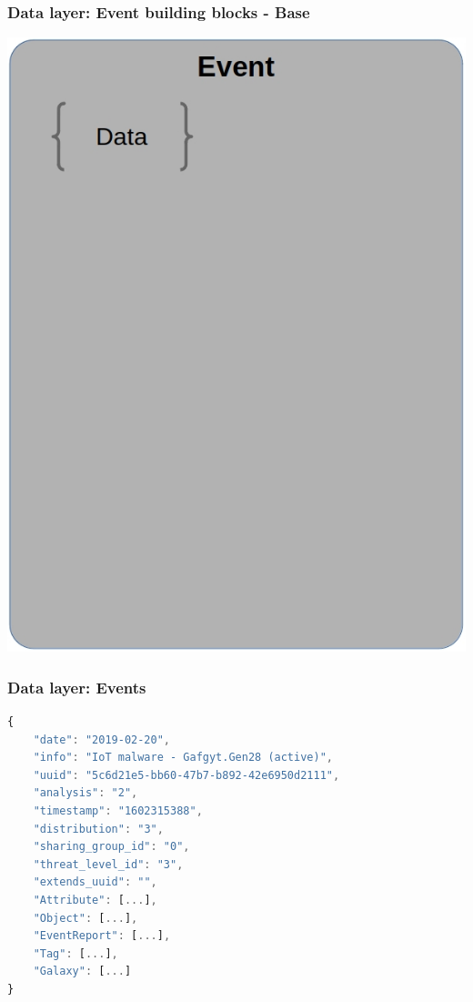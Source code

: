 \begin{frame}
    \frametitle{Data layer: Event building blocks - Base}
        \begin{center}
            \includegraphics[scale=0.33]{screenshots/event-building-blocks/event.png}
        \end{center}
\end{frame}

\begin{frame}[fragile]
    \frametitle{Data layer: Events}
        \begin{lstlisting}[language=javascript,firstnumber=1]
{
    "date": "2019-02-20",
    "info": "IoT malware - Gafgyt.Gen28 (active)",
    "uuid": "5c6d21e5-bb60-47b7-b892-42e6950d2111",
    "analysis": "2",
    "timestamp": "1602315388",
    "distribution": "3",
    "sharing_group_id": "0",
    "threat_level_id": "3",
    "extends_uuid": "",
    "Attribute": [...],
    "Object": [...],
    "EventReport": [...],
    "Tag": [...],
    "Galaxy": [...]
}
\end{lstlisting}
\end{frame}

